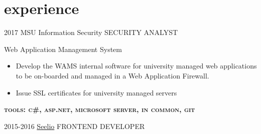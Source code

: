 \documentclass[]{friggeri-cv}
\begin{document}
\section{experience}

\begin{entrylist}
\entry
  {2017}
  {MSU Information Security}
  {SECURITY ANALYST}
  {
    Web Application Management System
    \begin{itemize}[topsep=0pt,leftmargin=0pt,itemsep=6pt]
      \item Develop the WAMS internal software for university managed web applications to be 
        on-boarded and managed in a Web Application Firewall.
      \item Issue SSL certificates for university managed servers 
    \end{itemize}
    \textbf{\textsc{tools: c\#, asp.net, microsoft server, in common, git}}
  }
\entry
  {2015-2016}
  {\textcolor{gray}{\FA \faMapMarker} \href{http://www.seelio.com/}{Seelio} }
  {FRONTEND DEVELOPER}
  {
}
\end{entrylist}
\end{document}
